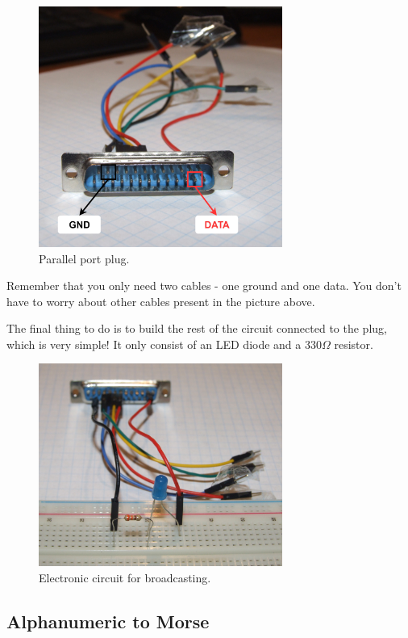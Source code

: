\documentclass[12pt]{report}
\begin{document}
\begin{figure}[H]
\centering\includegraphics[width=8cm]{parport_plug}
\caption{Parallel port plug.}				
\label{fig:parport_plug}
\end{figure}

Remember that you only need two cables - one ground and one data. You don't have to worry about other cables present in the picture above.

The final thing to do is to build the rest of the circuit connected to the plug, which is very simple! It only consist of an LED diode and a 330$\Omega$ resistor.

\begin{figure}[H]
\centering\includegraphics[width=8cm]{broadcast_circuit}
\caption{Electronic circuit for broadcasting.}				
\label{fig:broadcast_circuit}
\end{figure}




\subsection{Alphanumeric to Morse} \label{sec:asciitomorse}
\end{document}
